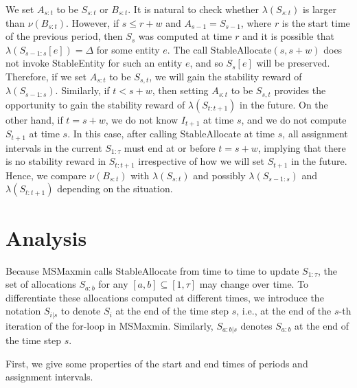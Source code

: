 \documentclass[11pt,a4paper]{article}
\renewcommand{\leq}{\leqslant}
\begin{document}
We set $A_{s:t}$ to be $S_{s:t}$ or $B_{s:t}$.  It is natural to check whether $\lambda(S_{s:t})$ is larger than $\nu(B_{s:t})$.  However, if $s \leq r+w$ and $A_{s-1} = S_{s-1}$, where $r$ is the start time of the previous period, then $S_s$ was computed at time $r$ and it is possible that $\lambda(S_{s-1:s}[e]) = \Delta$ for some entity $e$.  The call StableAllocate$(s,s+w)$ does not invoke StableEntity for such an entity $e$, and so $S_s[e]$ will be preserved.  Therefore, if we set $A_{s:t}$ to be $S_{s,t}$, we will gain the stability reward of $\lambda(S_{s-1:s})$.  Similarly, if $t < s+w$, then setting $A_{s:t}$ to be $S_{s,t}$ provides the opportunity to gain the stability reward of $\lambda(S_{t:t+1})$ in the future.   On the other hand, if $t = s+w$, we do not know $I_{t+1}$ at time $s$, and we do not compute $S_{t+1}$ at time $s$.  In this case, after calling StableAllocate at time $s$, all assignment intervals in the current $S_{1:\tau}$ must end at or before $t = s+w$, implying that there is no stability reward in $S_{t:t+1}$ irrespective of how we will set $S_{t+1}$ in the future.  Hence, we compare $\nu(B_{s:t})$ with $\lambda(S_{s:t})$ and possibly $\lambda(S_{s-1:s})$ and $\lambda(S_{t:t+1})$ depending on the situation.




\section{Analysis}
 
Because MSMaxmin calls StableAllocate from time to time to update $S_{1:\tau}$, the set of allocations $S_{a:b}$ for any $[a,b] \subseteq [1,\tau]$ may change over time.  To differentiate these allocations computed at different times, we introduce the notation $S_{i|s}$ to denote $S_i$ at the end of the time step $s$, i.e., at the end of the $s$-th iteration of the for-loop in MSMaxmin.   Similarly, $S_{a:b|s}$ denotes $S_{a:b}$ at the end of the time step $s$.  

First, we give some properties of the start and end times of periods and assignment intervals.
\end{document}
